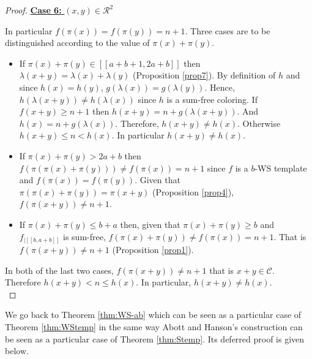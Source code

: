 \documentclass{article}
\newtheorem{computational theorem}[definition]{Computational Theorem}
\begin{document}
\begin{proof}
\noindent \underline{\textbf{Case 6:} \((x,y) \in \mathcal{R}^2\)}
\par
In particular \(f(\pi(x)) = f(\pi(y))=n + 1\). Three cases are to be distinguished according to the value of \(\pi(x) + \pi(y)\).
\begin{itemize}
\item If \(\pi(x) + \pi(y) \in [\![a + b + 1, 2 a + b]\!]\) then \(\lambda(x + y) = \lambda(x) + \lambda(y)\)
	(Proposition \ref{prop7}). By definition of \(h\) and since \(h(x) = h(y)\), \(g(\lambda(x)) = g(\lambda(y))\).
	Hence, \(h(\lambda(x + y)) \neq h(\lambda(x))\) since \(h\) is a sum-free coloring. If \(f(x+y) \geqslant n + 1\)
	then \(h(x + y) = n + g(\lambda(x + y))\). And \(h(x) = n + g(\lambda(x))\). Therefore, \(h(x + y)  \neq h(x)\).
	Otherwise \(h(x+y) \leqslant n < h(x)\). In particular \(h(x + y) \neq h(x)\).
\item If \(\pi(x)+\pi(y)>2a+b\) then \(f(\pi(\pi(x)+\pi(y))) \neq f(\pi(x)) = n + 1\) since \(f\) is a \(b\)-WS template and
	\(f(\pi(x)) = f(\pi(y))\). Given that \(\pi(\pi(x)+\pi(y)) = \pi(x+y)\) (Proposition \ref{prop4}), \(f(\pi(x+y)) \neq n + 1\).
\item \begin{sloppypar}
	If \(\pi(x)+\pi(y)\leqslant b+a\) then, given that \(\pi(x)+\pi(y) \geqslant b\) and \(f_{| [\![b, a + b ]\!]}\) is
	sum-free, \({f(\pi(x) + \pi(y)) \neq f(\pi(x)) = n + 1}\). That is \({f(\pi(x + y)) \neq n + 1}\) (Proposition \ref{prop1}).
	\end{sloppypar}
\end{itemize}
\par
In both of the last two cases, \({f(\pi(x + y)) \neq n + 1}\) that is \(x+y \in \mathcal{C}\). Therefore \(h(x+y) < n \leqslant h(x)\).
In particular, \(h(x + y) \neq h(x)\). \\
\end{proof}

We go back to Theorem \ref{thm:WS-ab} which can be seen as a particular case of Theorem \ref{thm:WStemp} in the same way Abott and Hanson's 
construction \cite{AbbottHanson} can be seen as a particular case of Theorem \ref{thm:Stemp}. Its deferred proof is given below.
\end{document}
